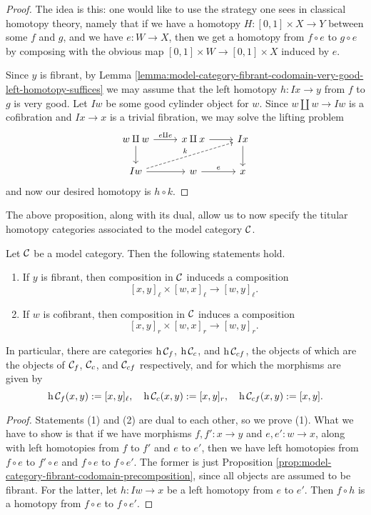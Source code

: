 \begin{proof}
The idea is this: one would like to use the strategy one sees in classical homotopy theory, namely that if we have a homotopy \(H\!:[0,1]\times X\to Y\) between some \(f\) and \(g\),
and we have \(e\!:W\to X\), then we get a homotopy from \(f\circ e\) to \(g\circ e\) by composing with the obvious map \([0,1]\times W\to [0,1]\times X\) induced by \(e\).

Since \(y\) is fibrant, by Lemma \ref{lemma:model-category-fibrant-codomain-very-good-left-homotopy-suffices} we may assume that the left homotopy \(h\!:Ix\to y\) from \(f\) to \(g\) is very good.
Let \(Iw\) be some good cylinder object for \(w\). Since \(w\amalg w \to Iw\) is a cofibration and \(Ix\to x\) is a trivial fibration, we may solve the lifting problem
\[
	\begin{tikzcd}
		w\amalg w\ar[d] \ar[r,"e\amalg e"] & x \amalg x \ar[r] & Ix \ar[d] \\
		Iw\ar[r]\ar[urr,dashed,"k"] & w\ar[r,"e"] & x
	\end{tikzcd}
\]
and now our desired homotopy is \(h\circ k\).
\end{proof}

The above proposition, along with its dual, allow us to now specify the titular homotopy categories associated to the model category \(\mathcal{C}\).

\begin{propositiondef}\label{prop:propdef-model-category-homotopy-composition}
	Let \(\mathcal{C}\) be a model category. Then the following statements hold.
	\begin{enumerate}[label=(\arabic*)]
		\item If \(y\) is fibrant, then composition in \(\mathcal{C}\) induceds a composition
			\[ [x,y]_\ell \times [w,x]_\ell \to [w,y]_\ell. \]
		\item If \(w\) is cofibrant, then composition in \(\mathcal{C}\) induces a composition
			\[ [x,y]_r \times [w,x]_r \to [w,y]_r. \]
	\end{enumerate}
	In particular, there are categories \(\operatorname{h}{\mathcal{C}_f}\), \(\operatorname{h}{\mathcal{C}_c}\), and \(\operatorname{h}{\mathcal{C}_{cf}}\), the objects of which are the objects of \(\mathcal{C}_f\), \(\mathcal{C}_c\), and \(\mathcal{C}_{cf}\) respectively,
	and for which the morphisms are given by
	\[ \operatorname{h}{\mathcal{C}_f}(x,y) := [x,y]_\ell,\quad \operatorname{h}{\mathcal{C}_c}(x,y) := [x,y]_r,\quad \operatorname{h}{\mathcal{C}_{cf}}(x,y) := [x,y]. \]
\end{propositiondef}
\begin{proof}
Statements (1) and (2) are dual to each other, so we prove (1). What we have to show is that if we have morphisms \(f,f'\!:x\to y\) and \(e,e'\!:w\to x\), along
with left homotopies from \(f\) to \(f'\) and \(e\) to \(e'\), then we have left homotopies from \(f\circ e\) to \(f'\circ e\) and \(f\circ e\) to \(f\circ e'\).
The former is just Proposition \ref{prop:model-category-fibrant-codomain-precomposition}, since all objects are assumed to be fibrant. For the latter,
let \(h\!:Iw\to x\) be a left homotopy from \(e\) to \(e'\). Then \(f\circ h\) is a homotopy from \(f\circ e\) to \(f\circ e'\).
\end{proof}

